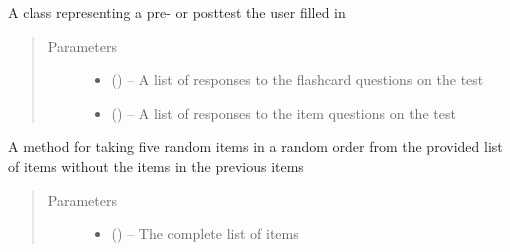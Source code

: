 \documentclass[letterpaper,10pt,english]{sphinxmanual}
\begin{document}
\begin{fulllineitems}
\label{\detokenize{test:test.Test}}
A class representing a pre- or posttest the user filled in
\begin{quote}\begin{description}
\item[{Parameters}] \leavevmode\begin{itemize}
\item {} 
 ({\hyperref[\detokenize{test_flashcard_response:test_flashcard_response.TestFlashcardResponse}]{}}) -- A list of responses to the flashcard questions on the test

\item {} 
 ({\hyperref[\detokenize{test_item_response:test_item_response.TestItemResponse}]{}}) -- A list of responses to the item questions on the test

\end{itemize}

\end{description}\end{quote}

\begin{fulllineitems}
\label{\detokenize{test:test.Test.generate_test}}
A method for taking five random items in a random order from the provided list of items without the items in the previous items
\begin{quote}\begin{description}
\item[{Parameters}] \leavevmode\begin{itemize}
\item {} 
 (\href{https://docs.python.org/2/library/functions.html\#list}{}\href{https://docs.python.org/2/library/functions.html\#list}{}\sphinxstyleliteralemphasis{)}\sphinxstyleliteralemphasis{}) -- The complete list of items


\end{itemize}
\end{description}
\end{quote}
\end{fulllineitems}
\end{fulllineitems}
\end{document}
